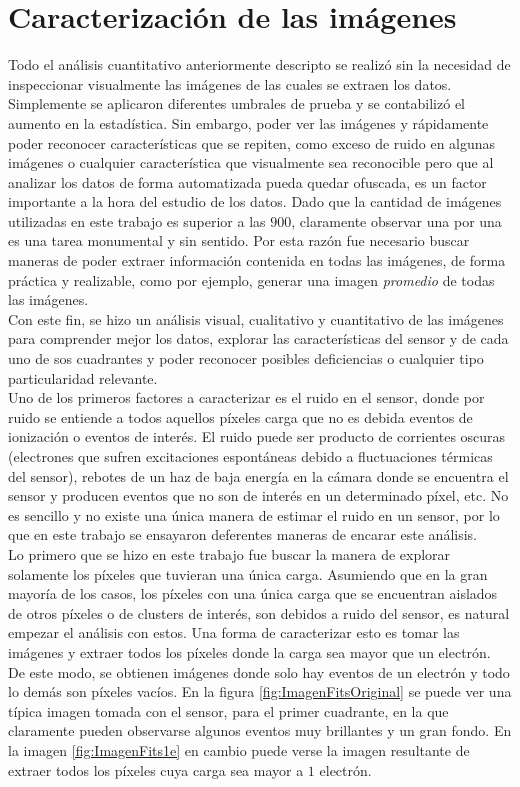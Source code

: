 \section{Caracterización de las imágenes}
\noindent Todo el análisis cuantitativo anteriormente descripto se realizó sin la necesidad de inspeccionar visualmente las imágenes de las cuales se extraen los datos. Simplemente se aplicaron diferentes umbrales de prueba y se contabilizó el aumento en la estadística. Sin embargo, poder ver las imágenes y rápidamente poder reconocer características que se repiten, como exceso de ruido en algunas imágenes o cualquier característica que visualmente sea reconocible pero que al analizar los datos de forma automatizada pueda quedar ofuscada, es un factor importante a la hora del estudio de los datos. Dado que la cantidad de imágenes utilizadas en este trabajo es superior a las $900$, claramente observar una por una es una tarea monumental y sin sentido. Por esta razón fue necesario buscar maneras de poder extraer información contenida en todas las imágenes, de forma práctica y realizable, como por ejemplo, generar una imagen \textit{promedio} de todas las imágenes.\\
\indent Con este fin, se hizo un análisis visual, cualitativo y cuantitativo de las imágenes para comprender mejor los datos, explorar las características del sensor y de cada uno de sos cuadrantes y poder reconocer posibles deficiencias o cualquier tipo particularidad relevante.\\
\indent Uno de los primeros factores a caracterizar es el ruido en el sensor, donde por ruido se entiende a todos aquellos píxeles carga que no es debida eventos de ionización o eventos de interés. El ruido puede ser producto de corrientes oscuras (electrones que sufren excitaciones espontáneas debido a fluctuaciones térmicas del sensor), rebotes de un haz de baja energía en la cámara donde se encuentra el sensor y producen eventos que no son de interés en un determinado píxel, etc. No es sencillo y no existe una única manera de estimar el ruido en un sensor, por lo que en este trabajo se ensayaron deferentes maneras de encarar este análisis. \\
\indent Lo primero que se hizo en este trabajo fue buscar la manera de explorar solamente los píxeles que tuvieran una única carga. Asumiendo que en la gran mayoría de los casos, los píxeles con una única carga que se encuentran aislados de otros píxeles o de clusters de interés, son debidos a ruido del sensor, es natural empezar el análisis con estos. Una forma de caracterizar esto es tomar las imágenes y extraer todos los píxeles donde la carga sea mayor que un electrón. De este modo, se obtienen imágenes donde solo hay eventos de un electrón y todo lo demás son píxeles vacíos. En la figura \ref{fig:ImagenFitsOriginal} se puede ver una típica imagen tomada con el sensor, para el primer cuadrante, en la que claramente pueden observarse algunos eventos muy brillantes y un gran fondo. En la imagen \ref{fig:ImagenFits1e} en cambio puede verse la imagen resultante de extraer todos los píxeles cuya carga sea mayor a $1$ electrón.
